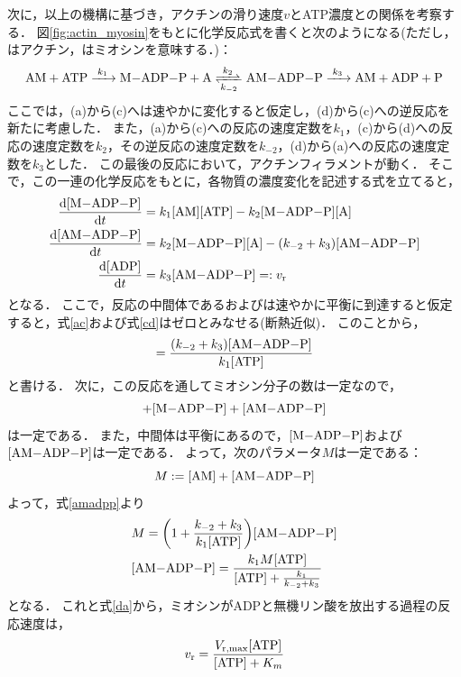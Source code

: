 \documentclass[a4paper,11pt, titlepage]{jsarticle}
\begin{document}
次に，以上の機構に基づき，アクチンの滑り速度$v$とATP濃度との関係を考察する．
図\ref{fig:actin_myosin}をもとに化学反応式を書くと次のようになる(ただし，はアクチン，はミオシンを意味する．)：
\begin{equation}
    \ce{AM + ATP ->[${k_1}$] M-ADP-P + A <=>[${k_2}$][${k_{-2}}$] AM-ADP-P ->[${k_3}$] AM + ADP + P} 
\end{equation}
ここでは，(a)から(c)へは速やかに変化すると仮定し，(d)から(c)への逆反応を新たに考慮した．
また，(a)から(c)への反応の速度定数を$k_1$，(c)から(d)への反応の速度定数を$k_2$，その逆反応の速度定数を$k_{-2}$，(d)から(a)への反応の速度定数を$k_3$とした．
この最後の反応において，アクチンフィラメントが動く．
そこで，この一連の化学反応をもとに，各物質の濃度変化を記述する式を立てると，
\begin{align}
    \dv{[\ce{M-ADP-P}]}{t} &= k_1[\ce{AM}][\ce{ATP}] - k_2[\ce{M-ADP-P}][\ce{A}] \label{ac}\\
    \dv{[\ce{AM-ADP-P}]}{t} &= k_2[\ce{M-ADP-P}][\ce{A}] -(k_{-2} + k_3)[\ce{AM-ADP-P}] \label{cd} \\
    \dv{[\ce{ADP}]}{t} &= k_3[\ce{AM-ADP-P}] =: v_{\mathrm{r}} \label{da}
\end{align}
となる．
ここで，反応の中間体であるおよびは速やかに平衡に到達すると仮定すると，式\eqref{ac}および式\eqref{cd}はゼロとみなせる(断熱近似)．
このことから，
\begin{equation}
    [\ce{AM}] = \frac{(k_{-2} + k_3)[\ce{AM-ADP-P}]}{k_1[\ce{ATP}]} \label{amadpp}
\end{equation}
と書ける．
次に，この反応を通してミオシン分子の数は一定なので，
\begin{equation}
    [\ce{AM}] + [\ce{M-ADP-P}] + [\ce{AM-ADP-P}]
\end{equation}
は一定である．
また，中間体は平衡にあるので，$[\ce{M-ADP-P}]$および$[\ce{AM-ADP-P}]$は一定である．
よって，次のパラメータ$M$は一定である：
\begin{equation}
    M := [\ce{AM}] + [\ce{AM-ADP-P}]
\end{equation}
よって，式\eqref{amadpp}より
\begin{align}
    &M = \qty(1 + \frac{k_{-2} + k_3}{k_1[\ce{ATP}]})[\ce{AM-ADP-P}]  \\
    &[\ce{AM-ADP-P}] = \frac{k_1 M[\ce{ATP}]}{[\ce{ATP}] + \frac{k_1}{k_{-2} + k_3}}
\end{align}
となる．
これと式\eqref{da}から，ミオシンがADPと無機リン酸を放出する過程の反応速度は，
\begin{equation}
    v_{\mathrm{r}} = \frac{V_{\mathrm{r,max}}[\ce{ATP}]}{[\ce{ATP}] + K_m}
\end{equation}
\end{document}
